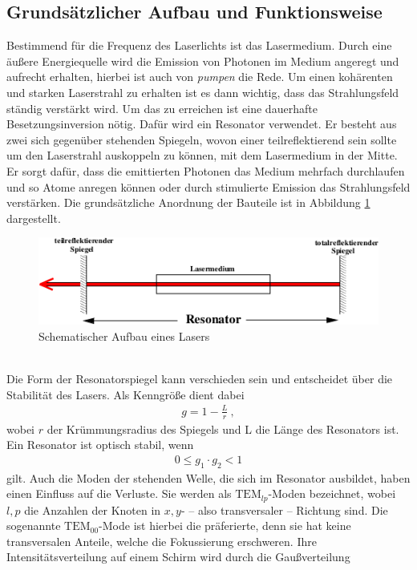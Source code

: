 \subsection{Grundsätzlicher Aufbau und Funktionsweise}
Bestimmend für die Frequenz des Laserlichts ist das Lasermedium. Durch eine äußere Energiequelle wird die Emission von Photonen im Medium angeregt und aufrecht erhalten, hierbei ist auch von \textit{pumpen} die Rede. Um einen kohärenten und starken Laserstrahl zu erhalten ist es dann wichtig, dass das Strahlungsfeld ständig verstärkt wird. Um das zu erreichen ist eine dauerhafte Besetzungsinversion nötig. Dafür wird ein Resonator verwendet. Er besteht aus zwei sich gegenüber stehenden Spiegeln, wovon einer teilreflektierend sein sollte um den Laserstrahl auskoppeln zu können, mit dem Lasermedium in der Mitte. Er sorgt dafür, dass die emittierten Photonen das Medium mehrfach durchlaufen und so Atome anregen können oder durch stimulierte Emission das Strahlungsfeld verstärken. Die grundsätzliche Anordnung der Bauteile ist in Abbildung \ref{fig:BasicLaser} dargestellt.
\begin{figure}[h!]
	\centering
	\includegraphics[width=.6\textwidth]{BasicAufbau.png}
	\caption{Schematischer Aufbau eines Lasers \cite{V61}}
	\label{fig:BasicLaser}
\end{figure} \\
Die Form der Resonatorspiegel kann verschieden sein und entscheidet über die Stabilität des Lasers. Als Kenngröße dient dabei
\begin{align}
	g = 1-\frac{L}{r} \ ,
\end{align}
wobei $r$ der Krümmungsradius des Spiegels  und L die Länge des Resonators ist. Ein Resonator ist optisch stabil, wenn 
\begin{align}\label{eq:Stabilitat}
	0\leq g_1\cdot g_2<1
\end{align}
gilt. Auch die Moden der stehenden Welle, die sich im Resonator ausbildet, haben einen Einfluss auf die Verluste. Sie werden als $\text{TEM}_{lp}$-Moden bezeichnet, wobei $l,p$ die Anzahlen der Knoten in $x,y$- -- also transversaler -- Richtung sind. Die sogenannte $\text{TEM}_{00}$-Mode ist hierbei die präferierte, denn sie hat keine transversalen Anteile, welche die Fokussierung erschweren. Ihre Intensitätsverteilung auf einem Schirm wird durch die Gaußverteilung
